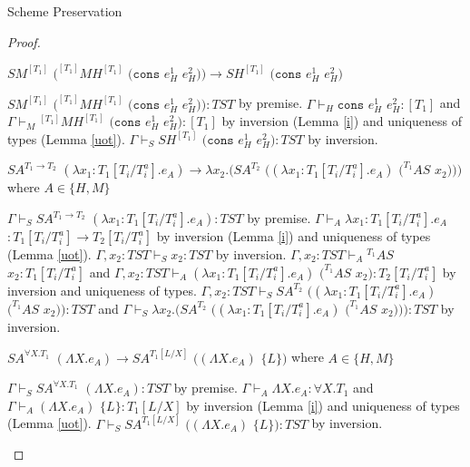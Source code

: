 \begin{theorem}{Scheme Preservation}
\begin{proof}

\begin{case}
$SM^{[T_{1}]}$ $(^{[T_{1}]}MH^{[T_{1}]}$ $(\mathtt{cons}$ $e_{H}^{1}$ $e_{H}^{2}))\rightarrow SH^{[T_{1}]}$ $(\mathtt{cons}$ $e_{H}^{1}$ $e_{H}^{2})$

$SM^{[T_{1}]}$ $(^{[T_{1}]}MH^{[T_{1}]}$ $(\mathtt{cons}$ $e_{H}^{1}$ $e_{H}^{2})):TST$ by premise.  $\Gamma\vdash_{H}\mathtt{cons}$ $e_{H}^{1}$ $e_{H}^{2}:[T_{1}]$ and $\Gamma\vdash_{M}{^{[T_{1}]}M}H^{[T_{1}]}$ $(\mathtt{cons}$ $e_{H}^{1}$ $e_{H}^{2}):[T_{1}]$ by inversion (Lemma \ref{i}) and uniqueness of types (Lemma \ref{uot}).  $\Gamma\vdash_{S}SH^{[T_{1}]}$ $(\mathtt{cons}$ $e_{H}^{1}$ $e_{H}^{2}):TST$ by inversion.
\end{case}


\begin{case}
$SA^{T_{1}\rightarrow T_{2}}$ $(\lambda x_{1}:T_{1}[T_{i}/T_{i}^{a}].e_{A})\rightarrow\lambda x_{2}.(SA^{T_{2}}$ $((\lambda x_{1}:T_{1}[T_{i}/T_{i}^{a}].e_{A})$ $(^{T_{1}}AS$ $x_{2})))$ where $A\in\lbrace H,M\rbrace$

$\Gamma\vdash_{S}SA^{T_{1}\rightarrow T_{2}}$ $(\lambda x_{1}:T_{1}[T_{i}/T_{i}^{a}].e_{A}):TST$ by premise.  $\Gamma\vdash_{A}\lambda x_{1}:T_{1}[T_{i}/T_{i}^{a}].e_{A}$ $:T_{1}[T_{i}/T_{i}^{a}]\rightarrow T_{2}[T_{i}/T_{i}^{a}]$ by inversion (Lemma \ref{i}) and uniqueness of types (Lemma \ref{uot}).  $\Gamma,x_{2}:TST\vdash_{S}x_{2}:TST$ by inversion.  $\Gamma,x_{2}:TST\vdash_{A}{^{T_{1}}A}S$ $x_{2}:T_{1}[T_{i}/T_{i}^{a}]$ and $\Gamma,x_{2}:TST\vdash_{A}(\lambda x_{1}:T_{1}[T_{i}/T_{i}^{a}].e_{A})$ $(^{T_{1}}AS$ $x_{2}):T_{2}[T_{i}/T_{i}^{a}]$ by inversion and uniqueness of types.  $\Gamma,x_{2}:TST\vdash_{S}SA^{T_{2}}$ $((\lambda x_{1}:T_{1}[T_{i}/T_{i}^{a}].e_{A})$ $(^{T_{1}}AS$ $x_{2})):TST$ and $\Gamma\vdash_{S}\lambda x_{2}.(SA^{T_{2}}$ $((\lambda x_{1}:T_{1}[T_{i}/T_{i}^{a}].e_{A})$ $(^{T_{1}}AS$ $x_{2}))):TST$ by inversion.
\end{case}


\begin{case}
$SA^{\forall X.T_{1}}$ $(\Lambda X.e_{A})\rightarrow SA^{T_{1}[L/X]}$ $((\Lambda X.e_{A})$ $\lbrace L\rbrace)$ where $A\in\lbrace H,M\rbrace$

$\Gamma\vdash_{S}SA^{\forall X.T_{1}}$ $(\Lambda X.e_{A}):TST$ by premise.  $\Gamma\vdash_{A}\Lambda X.e_{A}:\forall X.T_{1}$ and $\Gamma\vdash_{A}(\Lambda X.e_{A})$ $\lbrace L\rbrace:T_{1}[L/X]$ by inversion (Lemma \ref{i}) and uniqueness of types (Lemma \ref{uot}).  $\Gamma\vdash_{S}SA^{T_{1}[L/X]}$ $((\Lambda X.e_{A})$ $\lbrace L\rbrace):TST$ by inversion.
\end{case}

\end{proof}

\end{theorem}

